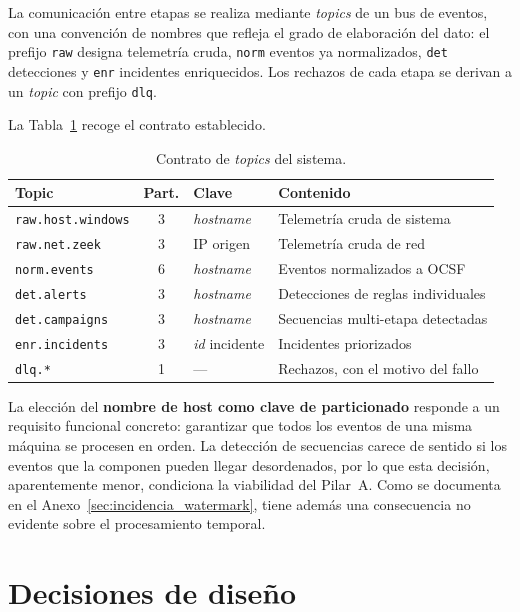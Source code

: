 La comunicación entre etapas se realiza mediante \textit{topics} de un bus de eventos, con
una convención de nombres que refleja el grado de elaboración del dato: el prefijo
\texttt{raw} designa telemetría cruda, \texttt{norm} eventos ya normalizados, \texttt{det}
detecciones y \texttt{enr} incidentes enriquecidos. Los rechazos de cada etapa se derivan a
un \textit{topic} con prefijo \texttt{dlq}.

La Tabla~\ref{tab:topics} recoge el contrato establecido.

\begin{table}[H]
\centering
\begin{tabular}{|l|c|l|l|}
\hline
\textbf{Topic} & \textbf{Part.} & \textbf{Clave} & \textbf{Contenido} \\
\hline
\texttt{raw.host.windows} & 3 & \textit{hostname} & Telemetría cruda de sistema \\
\texttt{raw.net.zeek} & 3 & IP origen & Telemetría cruda de red \\
\texttt{norm.events} & 6 & \textit{hostname} & Eventos normalizados a OCSF \\
\texttt{det.alerts} & 3 & \textit{hostname} & Detecciones de reglas individuales \\
\texttt{det.campaigns} & 3 & \textit{hostname} & Secuencias multi-etapa detectadas \\
\texttt{enr.incidents} & 3 & \textit{id} incidente & Incidentes priorizados \\
\texttt{dlq.*} & 1 & --- & Rechazos, con el motivo del fallo \\
\hline
\end{tabular}
\caption{Contrato de \textit{topics} del sistema.}
\label{tab:topics}
\end{table}

La elección del \textbf{nombre de host como clave de particionado} responde a un requisito
funcional concreto: garantizar que todos los eventos de una misma máquina se procesen en
orden. La detección de secuencias carece de sentido si los eventos que la componen pueden
llegar desordenados, por lo que esta decisión, aparentemente menor, condiciona la viabilidad
del Pilar~A. Como se documenta en el Anexo~\ref{sec:incidencia_watermark}, tiene además una
consecuencia no evidente sobre el procesamiento temporal.

\section{Decisiones de diseño}

